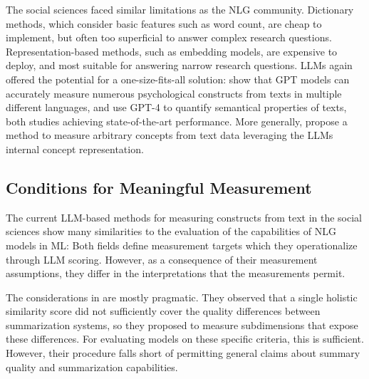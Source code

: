 The social sciences faced similar limitations as the NLG community. Dictionary methods, which consider basic features such as word count, are cheap to implement, but often too superficial to answer complex research questions. Representation-based methods, such as embedding models, are expensive to deploy, and most suitable for answering narrow research questions. LLMs again offered the potential for a one-size-fits-all solution: \citet{rathjeGPTEffectiveTool2024} show that GPT models can accurately measure numerous psychological constructs from texts in multiple different languages, and \citet{lemensUncoveringSemanticsConcepts2023} use GPT-4 to quantify semantical properties of texts, both studies achieving state-of-the-art performance. More generally, \citet{yangLLMMeasureGeneratingValid2024} propose a method to measure arbitrary concepts from text data leveraging the LLMs internal concept representation. 

\subsection{Conditions for Meaningful Measurement}

The current LLM-based methods for measuring constructs from text in the social sciences show many similarities to the evaluation of the capabilities of NLG models in ML: Both fields define measurement targets which they operationalize through LLM scoring. However, as a consequence of their measurement assumptions, they differ in the interpretations that the measurements permit.

The considerations in \citet{fabbri_summeval_2021} are mostly pragmatic. They observed that a single holistic similarity score did not sufficiently cover the quality differences between summarization systems, so they proposed to measure subdimensions that expose these differences. For evaluating models on these specific criteria, this is sufficient. However, their procedure falls short of permitting general claims about summary quality and summarization capabilities. 

